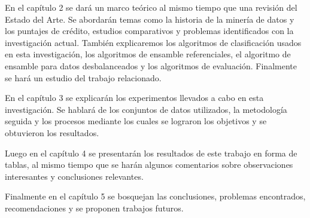 En el capítulo 2 se dará un marco teórico al mismo tiempo que una revisión del Estado del Arte. Se abordarán temas como la historia de la minería de datos y los puntajes de crédito, estudios comparativos y problemas identificados con la investigación actual. También explicaremos los algoritmos de clasificación usados en esta investigación, los algoritmos de ensamble referenciales, el algoritmo de ensamble para datos desbalanceados y los algoritmos de evaluación. Finalmente se hará un estudio del trabajo relacionado.

En el capítulo 3 se explicarán los experimentos llevados a cabo en esta investigación. Se hablará de los conjuntos de datos utilizados, la metodología seguida y los procesos mediante los cuales se lograron los objetivos y se obtuvieron los resultados.

Luego en el capítulo 4 se presentarán los resultados de este trabajo en forma de tablas, al mismo tiempo que se harán algunos comentarios sobre observaciones interesantes y conclusiones relevantes.

Finalmente en el capítulo 5 se bosquejan las conclusiones, problemas encontrados, recomendaciones y se proponen trabajos futuros.


